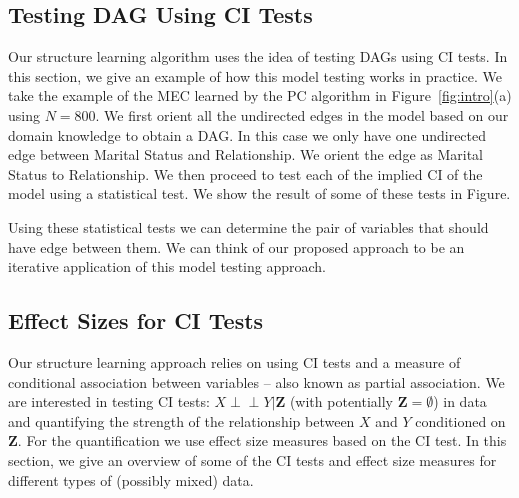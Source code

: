 \documentclass{uai2025} %
\def\ci{\perp\!\!\!\!\!\perp}
\begin{document}
\subsection{Testing DAG Using CI Tests}
Our structure learning algorithm uses the idea of testing DAGs using CI tests.
In this section, we give an example of how this model testing works in
practice. We take the example of the MEC learned by the PC algorithm in
Figure~\ref{fig:intro}(a) using $ N=800 $. We first orient all the undirected
edges in the model based on our domain knowledge to obtain a DAG. In this case
we only have one undirected edge between Marital Status and Relationship. We 
orient the edge as Marital Status to Relationship. We then proceed to test
each of the implied CI of the model using a statistical test. We show the result
of some of these tests in Figure.


Using these statistical tests we can determine the pair of variables that
should have edge between them. We can think of our proposed approach to be an
iterative application of this model testing approach.

\subsection{Effect Sizes for CI Tests}

Our structure learning approach relies on using CI tests and a measure of
conditional association between variables -- also known as partial association.
We are interested in testing CI tests: $ X \ci Y \rvert \bm{Z} $ (with
potentially $ \bm{Z} = \emptyset $) in data and quantifying the strength of the
relationship between $ X $ and $ Y $ conditioned on $ \bm{Z} $. For the
quantification we use effect size measures based on the CI test. In this
section, we give an overview of some of the CI tests and effect size measures
for different types of (possibly mixed) data.
\end{document}
